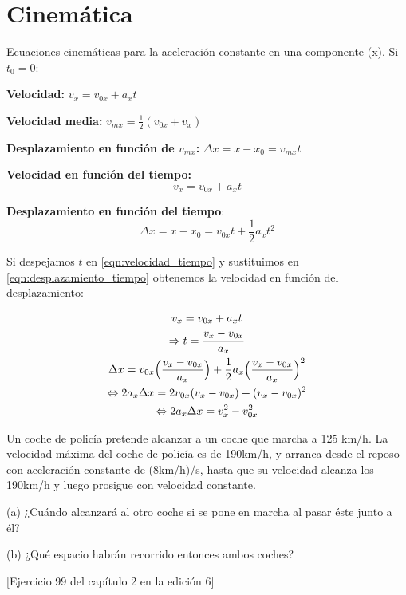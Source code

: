 \chapter{Cinemática}

Ecuaciones cinemáticas para la aceleración constante en una componente (x). Si $t_0 = 0:$

\textbf{Velocidad:} $v_x = v_{0x} + a_x t$

\textbf{Velocidad media:} $v_{mx} = \frac{1}{2}(v_{0x} + v_x)$

\textbf{Desplazamiento en función de $v_{mx}$:} $\Delta x = x - x_0 = v_{mx} t$

\textbf{Velocidad en función del tiempo:} 
\begin{equation}    
    \label{eqn:velocidad_tiempo}
v_x = v_{0x} + a_x t
\end{equation}

\textbf{Desplazamiento en función del tiempo}:
\begin{equation}
    \label{eqn:desplazamiento_tiempo}
\Delta x = x - x_0 = v_{0x}t + \frac{1}{2} a_x t^2
\end{equation}

Si despejamos $t$ en \ref{eqn:velocidad_tiempo} y sustituimos en \ref{eqn:desplazamiento_tiempo} obtenemos la velocidad en función del desplazamiento:

\begin{gather*}
    v_x = v_{0x} + a_x t \\
    \Rightarrow t = \frac{v_x - v_{0x}}{a_x} \\
    \Delta x = v_{0x}\Bigl(\frac{v_x - v_{0x}}{a_x}\Bigr) + \frac{1}{2} a_x \Bigl(\frac{v_x - v_{0x}}{a_x}\Bigr)^2 \\
    \Leftrightarrow 2 a_x \Delta x = 2v_{0x}(v_x - v_{0x}) + (v_x -v_{0x})^2 \\
    \Leftrightarrow 2 a_x \Delta x = v_x^2 - v_{0x}^2
\end{gather*}


\begin{ex}
Un coche de policía pretende alcanzar a un coche que marcha a 125 km/h. La velocidad máxima del coche de policía es de 190km/h, y arranca desde el reposo con aceleración constante de (8km/h)/s, hasta que su velocidad alcanza los 190km/h y luego prosigue con velocidad constante.

(a) ¿Cuándo alcanzará al otro coche si se pone en marcha al pasar éste junto a él?

(b) ¿Qué espacio habrán recorrido entonces ambos coches?

[Ejercicio 99 del capítulo 2 en la edición 6]
\end{ex}

